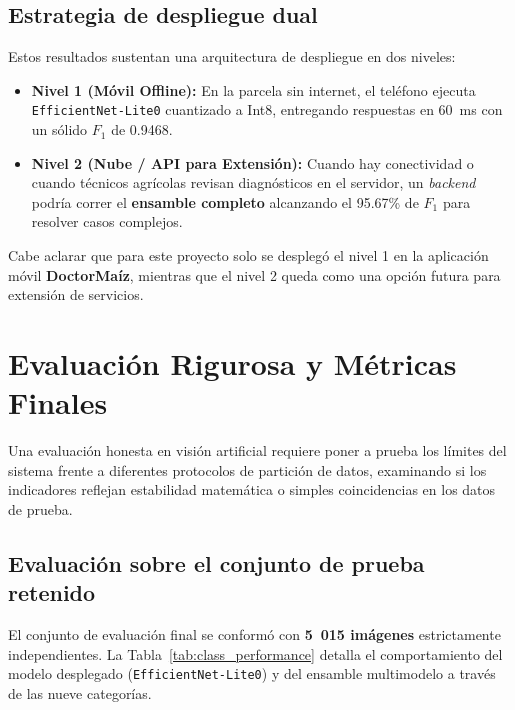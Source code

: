 \documentclass[12pt,letterpaper]{article}
\begin{document}
\subsection{Estrategia de despliegue dual}

Estos resultados sustentan una arquitectura de despliegue en dos niveles:
\begin{itemize}
\item \textbf{Nivel 1 (M\'ovil Offline):} En la parcela sin internet, el tel\'efono ejecuta \texttt{EfficientNet-Lite0} cuantizado a Int8, entregando respuestas en 60~ms con un s\'olido $F_1$ de 0.9468.
\item \textbf{Nivel 2 (Nube / API para Extensi\'on):} Cuando hay conectividad o cuando t\'ecnicos agr\'icolas revisan diagn\'osticos en el servidor, un \textit{backend} podría correr el \textbf{ensamble completo} alcanzando el 95.67\% de $F_1$ para resolver casos complejos.
\end{itemize}

Cabe aclarar que para este proyecto solo se despleg\'o el nivel 1 en la aplicaci\'on m\'ovil \textbf{DoctorMa\'iz}, mientras que el nivel 2 queda como una opci\'on futura para extensi\'on de servicios.

\newpage

\section{Evaluaci\'on Rigurosa y M\'etricas Finales}

Una evaluaci\'on honesta en visi\'on artificial requiere poner a prueba los l\'imites del sistema frente a diferentes protocolos de partici\'on de datos, examinando si los indicadores reflejan estabilidad matem\'atica o simples coincidencias en los datos de prueba.

\subsection{Evaluaci\'on sobre el conjunto de prueba retenido}

El conjunto de evaluaci\'on final se conform\'o con \textbf{5~015 im\'agenes} estrictamente independientes. La Tabla~\ref{tab:class_performance} detalla el comportamiento del modelo desplegado (\texttt{EfficientNet-Lite0}) y del ensamble multimodelo a trav\'es de las nueve categor\'ias.
\end{document}
